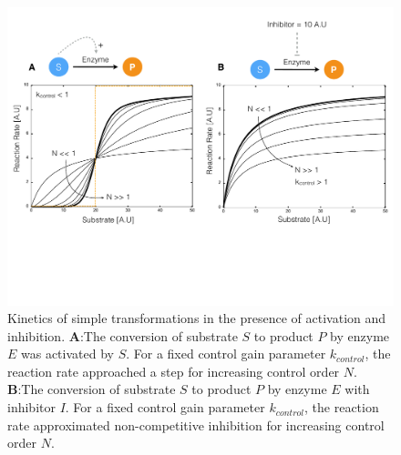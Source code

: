 \documentclass[processes,article,accept,moreauthors,pdftex,12pt,a4paper]{mdpi}
\begin{document}
\begin{figure}[H]
\centering
\includegraphics[width=1.0\textwidth]{./figs/Figure-3-EnzymeKinetics.pdf}
\caption{Kinetics of simple transformations in the presence of activation and inhibition. 
\textbf{A}:The conversion of substrate $S$ to product $P$ by enzyme $E$ was activated by $S$. 
For a fixed control gain parameter $k_{control}$, the reaction rate approached a step for increasing control order $N$. 
\textbf{B}:The conversion of substrate $S$ to product $P$ by enzyme $E$ with inhibitor $I$. 
For a fixed control gain parameter $k_{control}$, the reaction rate approximated non-competitive inhibition for increasing control order $N$. 
}\label{fig-kinetics-simulations}
\end{figure}
    
\end{document}
